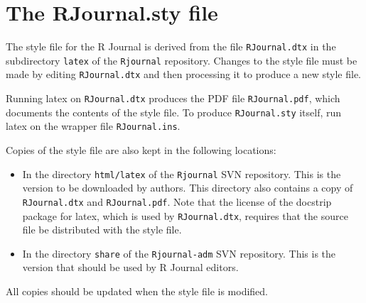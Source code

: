 \documentclass[11pt]{article}
\begin{document}
\appendix

\section{The RJournal.sty file}

The style file for the R Journal is derived from the file
\texttt{RJournal.dtx} in the subdirectory \texttt{latex} of the
\texttt{Rjournal} repository. Changes to the style file must be made
by editing \texttt{RJournal.dtx} and then processing it to produce
a new style file.

Running latex on \texttt{RJournal.dtx} produces the PDF file
\texttt{RJournal.pdf}, which documents the contents of the style file.
To produce \texttt{RJournal.sty} itself, run latex on the wrapper file
\texttt{RJournal.ins}.

Copies of the style file are also kept in the following locations:
\begin{itemize}
\item In the directory \texttt{html/latex} of the \texttt{Rjournal}
  SVN repository. This is the version to be downloaded by authors.
  This directory also contains a copy of \texttt{RJournal.dtx} and
  \texttt{RJournal.pdf}. Note that the license of the docstrip package
  for latex, which is used by \texttt{RJournal.dtx}, requires that the
  source file be distributed with the style file.
\item In the directory \texttt{share} of the \texttt{Rjournal-adm}
  SVN repository. This is the version that should be used by R Journal
  editors.
\end{itemize}
All copies should be updated when the style file is modified.
\end{document}
